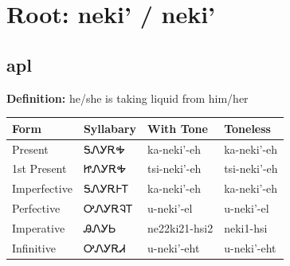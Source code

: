 \documentclass{article}%
\begin{document}
%
\normalsize%
\section*{Root: neki' / neki'}%
\subsection*{apl}%
\textbf{Definition: }%
he/she is taking liquid from him/her%
\\[0.5em]%
\begin{tabular}{|l|l|l|l|}%
\hline%
\textbf{Form}&\textbf{Syllabary}&\textbf{With Tone}&\textbf{Toneless}\\%
\hline%
Present&ᎦᏁᎩᎡᎭ&ka{-}neki'{-}eh&ka{-}neki'{-}eh\\%
1st Present&ᏥᏁᎩᎡᎭ&tsi{-}neki'{-}eh&tsi{-}neki'{-}eh\\%
Imperfective&ᎦᏁᎩᎡᎰᎢ&ka{-}neki'{-}eh&ka{-}neki'{-}eh\\%
Perfective&ᎤᏁᎩᎡᎸᎢ&u{-}neki'{-}el&u{-}neki'{-}el\\%
Imperative&ᎯᏁᎩᏏ&ne22ki21{-}hsi2&neki1{-}hsi\\%
Infinitive&ᎤᏁᎩᎡᏗ&u{-}neki'{-}eht&u{-}neki'{-}eht\\%
\hline%
\end{tabular}%
\\[1em]%
\end{document}

